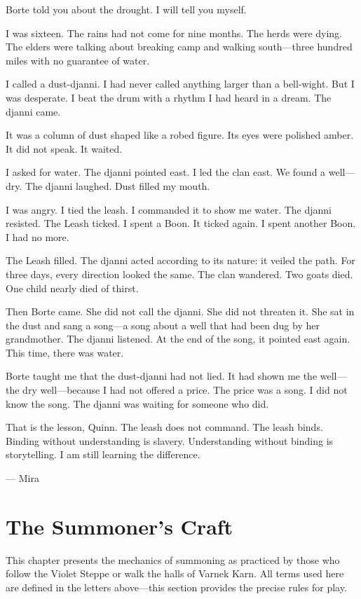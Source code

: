 \documentclass[11pt,twoside]{book}
\newcommand{\sealdecor}{%
  \begin{center}\textcolor{sealcolor}{\faStamp}\end{center}}
\begin{document}
Borte told you about the drought. I will tell you myself.

I was sixteen. The rains had not come for nine months. The herds were dying. The elders were talking about breaking camp and walking south---three hundred miles with no guarantee of water.

I called a dust-djanni. I had never called anything larger than a bell-wight. But I was desperate. I beat the drum with a rhythm I had heard in a dream. The djanni came.

It was a column of dust shaped like a robed figure. Its eyes were polished amber. It did not speak. It waited.

I asked for water. The djanni pointed east. I led the clan east. We found a well---dry. The djanni laughed. Dust filled my mouth.

I was angry. I tied the leash. I commanded it to show me water. The djanni resisted. The Leash ticked. I spent a Boon. It ticked again. I spent another Boon. I had no more.

The Leash filled. The djanni acted according to its nature: it veiled the path. For three days, every direction looked the same. The clan wandered. Two goats died. One child nearly died of thirst.

Then Borte came. She did not call the djanni. She did not threaten it. She sat in the dust and sang a song---a song about a well that had been dug by her grandmother. The djanni listened. At the end of the song, it pointed east again. This time, there was water.

Borte taught me that the dust-djanni had not lied. It had shown me the well---the dry well---because I had not offered a price. The price was a song. I did not know the song. The djanni was waiting for someone who did.

That is the lesson, Quinn. The leash does not command. The leash binds. Binding without understanding is slavery. Understanding without binding is storytelling. I am still learning the difference.

\vspace{0.5em}
\noindent\hfill --- Mira

\sealdecor


\chapter{The Summoner's Craft}
This chapter presents the mechanics of summoning as practiced by those who follow the Violet Steppe or walk the halls of Varnek Karn. All terms used here are defined in the letters above---this section provides the precise rules for play.
\end{document}
